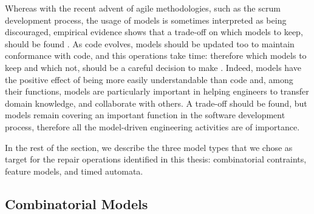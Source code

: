 Whereas with the recent advent of agile methodologies, such as the scrum development process, the usage of models is sometimes interpreted as being discouraged, empirical evidence shows that a trade-off on which models to keep, should be found \cite{blasband2016rise}. As code evolves, models should be updated too to maintain conformance with code, and this operations take time: therefore which models to keep and which not, should be a careful decision to make \cite{blasband2016rise}.
Indeed, models have the positive effect of being more easily understandable than code and, among their functions, models are particularly important in helping engineers to transfer domain knowledge, and collaborate with others.
A trade-off should be found, but models remain covering an important function in the software development process, therefore all the model-driven engineering activities are of importance.

In the rest of the section, we describe the three model types that we chose as target for the repair operations identified in this thesis: combinatorial contraints, feature models, and timed automata.

\subsection{Combinatorial Models}


